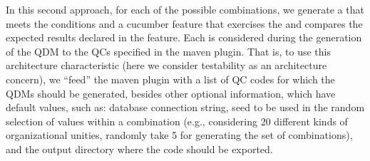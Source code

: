 
In this second approach, for each of the possible combinations, we generate a \shc that meets the conditions 
and a cucumber feature that exercises the \shc and compares the expected results declared in the feature. 
Each \shc is considered during the generation of the QDM to the QCs specified in the 
maven plugin.%
That is, to use this architecture characteristic (here we consider testability as an 
architecture concern), we ``feed'' the maven plugin with a list of QC codes for which the QDMs should be generated, 
besides other optional information, which have default values, such as: database connection string,
seed to be used in the random selection of values within a combination (e.g., considering 20 different
kinds of organizational unities, randomly take 5 for generating the set of combinations), and the output directory 
where the code should be exported. 

